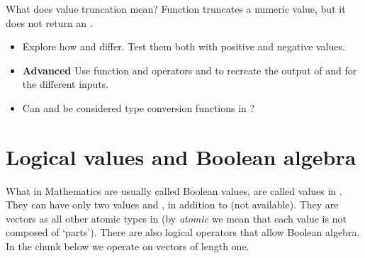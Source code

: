 \documentclass[krantz2]{krantz}\usepackage{knitr}%
\begin{document}
\begin{playground}
What does value truncation mean? Function  truncates a numeric value, but it does not return an .
\begin{itemize}
  \item Explore how  and  differ. Test them both with positive and negative values.
  \item \textbf{Advanced} Use function  and operators \Roperator{+} and \Roperator{-} to recreate the output of  and  for the different inputs.
  \item Can  and  be considered type conversion functions in \Rlang?
\end{itemize}
\end{playground}


\section{Logical values and Boolean algebra}\label{sec:calc:boolean}
What in Mathematics are usually called Boolean values, are called  values in \Rlang. They can have only two values  and , in addition to  (not available). They are vectors as all other atomic types in \Rlang (by \emph{atomic} we mean that each value is not composed of `parts'). There are also logical operators that allow Boolean algebra. In the chunk below we operate on  vectors of length one.
\end{document}
